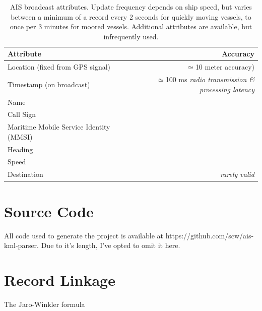 \begin{table}[htbp]
  \begin{tabular}{lr}
    Attribute & Accuracy \\
    \hline
    Location (fixed from GPS signal) & $\simeq$10 meter accuracy) \\
    Timestamp (on broadcast) & $\simeq$100 ms \textit{radio transmission \& processing latency}\\
    Name \\
    Call Sign \\
    Maritime Mobile Service Identity (MMSI) \\
    Heading \\
    Speed \\
    Destination & \textit{rarely valid}
  \end{tabular}
  \caption{AIS broadcast attributes. Update frequency depends on ship speed, but varies between a minimum of a record every 2 seconds for quickly moving vessels, to once per 3 minutes for moored vessels. Additional attributes are available, but infrequently used.}
  \label{table:ais-broadcast-attributes}
\end{table}

\newpage
\section{Source Code}
\label{sec:source-code}


All code used to generate the project is available at https://github.com/scw/ais-kml-parser. Due to it's length, I've opted to omit it here.



\section{Record Linkage}
\label{sec:record-linkage-appendix}

The Jaro-Winkler formula 

